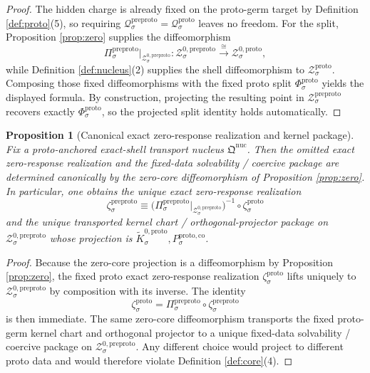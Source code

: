 \documentclass[11pt]{article}
\newcommand{\ProtoShellSet}[1]{\mathcal Z_{#1}^{\mathrm{proto}}}
\newcommand{\ProtoZeroCore}[1]{\mathcal Z_{#1}^{0,\mathrm{proto}}}
\newcommand{\ProtoSplit}[1]{\Phi_{#1}^{\mathrm{proto}}}
\newcommand{\ProtoCharge}[1]{\mathcal Q_{#1}^{\mathrm{proto}}}
\newcommand{\ProtoEmbed}[1]{\zeta_{#1}^{\mathrm{proto}}}
\newcommand{\ProtoKernelCh}[1]{\widetilde K_{#1}^{0,\mathrm{proto}}}
\newcommand{\ProtoStateComp}[1]{P_{#1}^{\mathrm{proto,co}}}
\newcommand{\PreProtoNucleus}{\mathfrak Q^{\mathrm{nuc}}}
\newcommand{\PreProtoProj}[1]{\Pi_{#1}^{\mathrm{preproto}}}
\newcommand{\PreProtoShellSet}[1]{\mathcal Z_{#1}^{\mathrm{preproto}}}
\newcommand{\PreProtoZeroCore}[1]{\mathcal Z_{#1}^{0,\mathrm{preproto}}}
\newcommand{\PreProtoCharge}[1]{\mathcal Q_{#1}^{\mathrm{preproto}}}
\newcommand{\PreProtoEmbed}[1]{\zeta_{#1}^{\mathrm{preproto}}}
\newtheorem{proposition}{Proposition}
\begin{document}
\begin{proof}
The hidden charge is already fixed on the proto-germ target by Definition \ref{def:proto}(5), so requiring \(\PreProtoCharge{\sigma}=\ProtoCharge{\sigma}\) leaves no freedom. For the split, Proposition \ref{prop:zero} supplies the diffeomorphism
\[
\PreProtoProj{\sigma}\big|_{\PreProtoZeroCore{\sigma}}
:
\PreProtoZeroCore{\sigma}
\xrightarrow{\cong}
\ProtoZeroCore{\sigma},
\]
while Definition \ref{def:nucleus}(2) supplies the shell diffeomorphism to \(\ProtoShellSet{\sigma}\). Composing those fixed diffeomorphisms with the fixed proto split \(\ProtoSplit{\sigma}\) yields the displayed formula. By construction, projecting the resulting point in \(\PreProtoShellSet{\sigma}\) recovers exactly \(\ProtoSplit{\sigma}\), so the projected split identity holds automatically.
\end{proof}

\begin{proposition}[Canonical exact zero-response realization and kernel package]
\label{prop:kernel}
Fix a proto-anchored exact-shell transport nucleus \(\PreProtoNucleus\). Then the omitted exact zero-response realization and the fixed-data solvability / coercive package are determined canonically by the zero-core diffeomorphism of Proposition \ref{prop:zero}. In particular, one obtains the unique exact zero-response realization
\[
\PreProtoEmbed{\sigma}
\equiv
\bigl(\PreProtoProj{\sigma}\big|_{\PreProtoZeroCore{\sigma}}\bigr)^{-1}
\circ
\ProtoEmbed{\sigma}
\]
and the unique transported kernel chart / orthogonal-projector package on \(\PreProtoZeroCore{\sigma}\) whose projection is \(\ProtoKernelCh{\sigma},\ProtoStateComp{\sigma}\).
\end{proposition}

\begin{proof}
Because the zero-core projection is a diffeomorphism by Proposition \ref{prop:zero}, the fixed proto exact zero-response realization \(\ProtoEmbed{\sigma}\) lifts uniquely to \(\PreProtoZeroCore{\sigma}\) by composition with its inverse. The identity
\[
\ProtoEmbed{\sigma}
=
\PreProtoProj{\sigma}\circ\PreProtoEmbed{\sigma}
\]
is then immediate. The same zero-core diffeomorphism transports the fixed proto-germ kernel chart and orthogonal projector to a unique fixed-data solvability / coercive package on \(\PreProtoZeroCore{\sigma}\). Any different choice would project to different proto data and would therefore violate Definition \ref{def:core}(4).
\end{proof}
\end{document}
